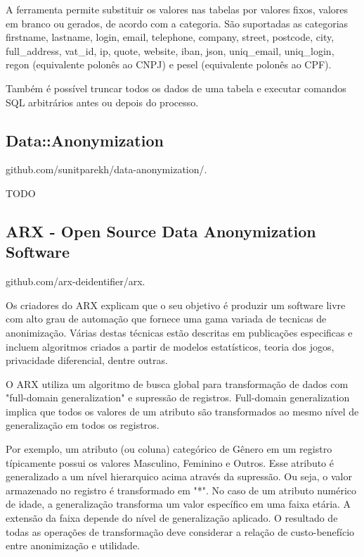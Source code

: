 A ferramenta permite substituir os valores nas tabelas por valores fixos, valores em branco ou gerados, de acordo com a categoria. São suportadas as categorias firstname, lastname, login, email, telephone, company, street, postcode, city, full{\_}address, vat{\_}id, ip, quote, website, iban, json, uniq{\_}email, uniq{\_}login, regon (equivalente polonês ao CNPJ) e pesel (equivalente polonês ao CPF). 

Também é possível truncar todos os dados de uma tabela e executar comandos SQL arbitrários antes ou depois do processo.

\subsection{Data::Anonymization}

github.com/sunitparekh/data-anonymization/.

TODO

\subsection{ARX - Open Source Data Anonymization Software}

github.com/arx-deidentifier/arx.

Os criadores do ARX explicam que o seu objetivo é produzir um software livre com alto grau de automação que fornece uma gama variada de tecnicas de anonimização. Várias destas técnicas estão descritas em publicações especificas e incluem algoritmos criados a partir de modelos estatísticos, teoria dos jogos, privacidade diferencial, dentre outras.

O ARX utiliza um algoritmo de busca global para transformação de dados com "full-domain generalization" e supressão de registros. Full-domain generalization implica que todos os  valores de um atributo são transformados ao mesmo nível de generalização em todos os registros.

Por exemplo, um atributo (ou coluna) categórico de Gênero em um registro típicamente possui os valores Masculino, Feminino e Outros. Esse atributo é generalizado a um nível hierarquico acima através da supressão. Ou seja, o valor armazenado no registro é transformado em "*". No caso de um atributo numérico de idade, a generalização transforma um valor específico em uma faixa etária. A extensão da faixa depende do nível de generalização aplicado. O resultado de todas as operações de transformação deve considerar a relação de custo-benefício entre anonimização e utilidade.

